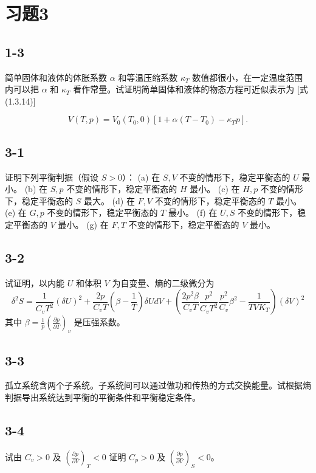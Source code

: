 \section{习题3}

\newpage
\subsection{1-3}
简单固体和液体的体胀系数 $\alpha$ 和等温压缩系数 $\kappa_T$ 数值都很小，在一定温度范围内可以把 $\alpha$ 和 $\kappa_T$ 看作常量。试证明简单固体和液体的物态方程可近似表示为 [式 (1.3.14)]

$$ V(T, p) = V_0 (T_0, 0) \left[ 1 + \alpha (T - T_0) - \kappa_T p \right] . $$

\newpage
\subsection{3-1}
证明下列平衡判据（假设 $S>0$）：
(a) 在 $S,V$ 不变的情形下，稳定平衡态的 $U$ 最小。
(b) 在 $S,p$ 不变的情形下，稳定平衡态的 $H$ 最小。
(c) 在 $H,p$ 不变的情形下，稳定平衡态的 $S$ 最大。
(d) 在 $F,V$ 不变的情形下，稳定平衡态的 $T$ 最小。
(e) 在 $G,p$ 不变的情形下，稳定平衡态的 $T$ 最小。
(f) 在 $U,S$ 不变的情形下，稳定平衡态的 $V$ 最小。
(g) 在 $F,T$ 不变的情形下，稳定平衡态的 $V$ 最小。

\newpage
\subsection{3-2}
试证明，以内能 $U$ 和体积 $V$ 为自变量、熵的二级微分为
$$ \delta^2 S=\frac{1}{C_vT^2}(\delta U)^2+\frac{2p}{C_vT}\left(\beta-\frac{1}{T}\right)\delta UdV+\left(\frac{2p^2\beta}{C_vT}\frac{p^2}{C_vT^2}\frac{p^2}{C_v}\beta^2-\frac{1}{TVK_T}\right)(\delta V)^2 $$
其中 $\beta=\frac{1}{p}\left(\frac{\partial p}{\partial T}\right)_v$ 是压强系数。

\newpage
\subsection{3-3}
孤立系统含两个子系统。子系统间可以通过做功和传热的方式交换能量。试根据熵判据导出系统达到平衡的平衡条件和平衡稳定条件。

\newpage
\subsection{3-4}
试由 $C_v > 0$ 及 $\left( \frac{\partial p}{\partial V} \right)_T < 0$ 证明 $C_p > 0$ 及 $\left( \frac{\partial p}{\partial V} \right)_S < 0$。

